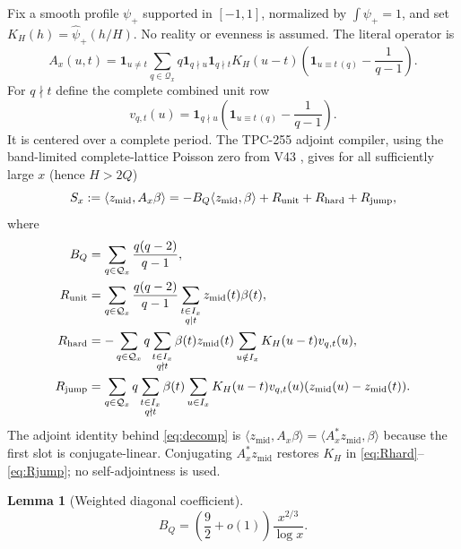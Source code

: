 \documentclass[10pt]{article}
\newtheorem{lemma}[theorem]{Lemma}
\newcommand{\one}{\mathbf 1}
\newcommand{\ip}[2]{\langle #1,#2\rangle}
\newcommand{\zm}{z_{\mathrm{mid}}}
\newcommand{\Ax}{A_x}
\newcommand{\Qx}{\mathcal Q_x}
\begin{document}
Fix a smooth profile $\psi_+$ supported in $[-1,1]$, normalized by
$\int\psi_+=1$, and set $K_H(h)=\widehat\psi_+(h/H)$.  No reality or
evenness is assumed.  The literal operator is \cite{v59,tpc255}
\begin{equation}
 \Ax(u,t)=\one_{u\ne t}\sum_{q\in\Qx}q\one_{q\nmid u}\one_{q\nmid t}
 K_H(u-t)\left(\one_{u\equiv t\,(q)}-\frac1{q-1}\right).      \label{eq:operator}
\end{equation}
For $q\nmid t$ define the complete combined unit row
\begin{equation}
 v_{q,t}(u)=\one_{q\nmid u}
 \left(\one_{u\equiv t\,(q)}-\frac1{q-1}\right).             \label{eq:unitrow}
\end{equation}
It is centered over a complete period.  The TPC-255 adjoint compiler, using
the band-limited complete-lattice Poisson zero from V43 \cite{v43,tpc255},
gives for all sufficiently large $x$ (hence $H>2Q$)
\begin{equation}
 S_x:=\ip{\zm}{\Ax\beta}
 =-B_Q\ip{\zm}{\beta}+R_{\rm unit}+R_{\rm hard}+R_{\rm jump}, \label{eq:decomp}
\end{equation}
where
\begin{align}
 B_Q&=\sum_{q\in\Qx}\frac{q(q-2)}{q-1},                       \label{eq:BQ}\\
 R_{\rm unit}&=\sum_{q\in\Qx}\frac{q(q-2)}{q-1}
       \sum_{\substack{t\in I_x\\q\mid t}}\zm(t)\beta(t), \label{eq:Runit}\\
 R_{\rm hard}&=-\sum_{q\in\Qx}q
       \sum_{\substack{t\in I_x\\q\nmid t}}\beta(t)\zm(t)
       \sum_{u\notin I_x}K_H(u-t)v_{q,t}(u),                  \label{eq:Rhard}\\
 R_{\rm jump}&=\sum_{q\in\Qx}q
       \sum_{\substack{t\in I_x\\q\nmid t}}\beta(t)
       \sum_{u\in I_x}K_H(u-t)v_{q,t}(u)(\zm(u)-\zm(t)).     \label{eq:Rjump}
\end{align}
The adjoint identity behind \eqref{eq:decomp} is
$\ip{\zm}{\Ax\beta}=\ip{\Ax^*\zm}{\beta}$ because the first slot is
conjugate-linear.  Conjugating $\Ax^*\zm$ restores $K_H$ in
\eqref{eq:Rhard}--\eqref{eq:Rjump}; no self-adjointness is used.

\begin{lemma}[Weighted diagonal coefficient]\label{lem:BQ}
\begin{equation}
 B_Q=\left(\frac92+o(1)\right)\frac{x^{2/3}}{\log x}.          \label{eq:BQasymp}
\end{equation}
\end{lemma}
\end{document}
